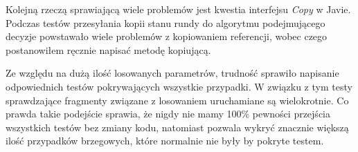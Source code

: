 Kolejną rzeczą sprawiającą wiele problemów jest kwestia interfejsu \textit{Copy} w Javie. Podczas testów przesyłania kopii stanu rundy do algorytmu podejmującego decyzje powstawało wiele problemów z kopiowaniem referencji, wobec czego postanowiłem ręcznie napisać metodę kopiującą.

Ze względu na dużą ilość losowanych parametrów, trudność sprawiło napisanie odpowiednich testów pokrywających wszystkie przypadki. W związku z tym testy sprawdzające fragmenty związane z losowaniem uruchamiane są wielokrotnie. Co prawda takie podejście sprawia, że nigdy nie mamy 100\% pewności przejścia wszystkich testów bez zmiany kodu, natomiast pozwala wykryć znacznie większą ilość przypadków brzegowych, które normalnie nie były by pokryte testem.